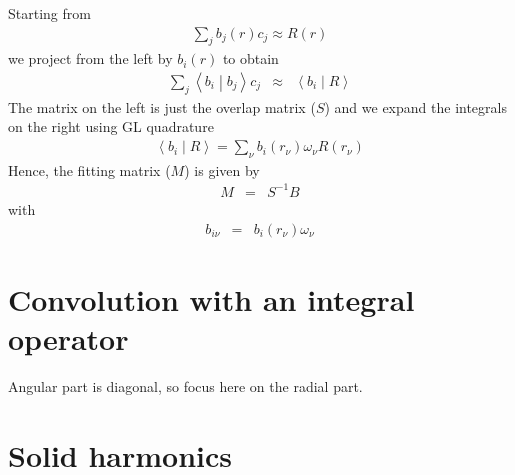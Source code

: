\documentclass[12pt]{article}
\begin{document}
Starting from 
\begin{eqnarray}
  \sum_j b_j(r) c_j \approx R(r)
\end{eqnarray}
we project from the left by $b_i(r)$ to obtain
\begin{eqnarray}
  \sum_j \left\langle b_i \middle| b_j\right\rangle c_j & \approx & \left\langle b_i \middle| R \right\rangle
\end{eqnarray}
The matrix on the left is just the overlap matrix ($S$) and we expand the integrals on the right using GL quadrature
\begin{eqnarray}
\left\langle b_i \middle| R \right\rangle = \sum_\nu b_i(r_\nu) \omega_\nu  R(r_\nu)
\end{eqnarray}
Hence, the fitting matrix ($M$) is given by
\begin{eqnarray}
   M & = & S^{-1} B
\end{eqnarray}
with
\begin{eqnarray}
  b_{i \nu} & = & b_i(r_\nu) \omega_\nu 
\end{eqnarray}

\section{Convolution with an integral operator}

Angular part is diagonal, so focus here on the radial part.

\section{Solid harmonics}
\end{document}
